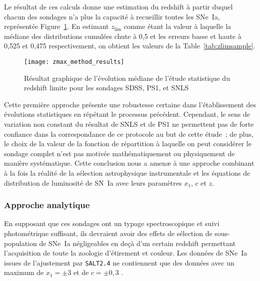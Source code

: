 \documentclass[../main/main.tex]{subfiles}
\begin{document}
Le résultat de ces calculs donne une estimation du redshift à partir duquel
chacun des sondages n'a plus la capacité à recueillir toutes les SNe~Ia,
représentée Figure~\ref{fig:zmax_method_results}. En estimant $z_{\lim}$ comme
étant la valeur à laquelle la médiane des distributions cumulées chute à 0,5 et
les erreurs basse et haute à 0,525 et 0,475 respectivement, on obtient les
valeurs de la Table~\ref{tab:zlimsample}.

\begin{figure}[ht]
    \centering
    \texttt{[image: zmax\_method\_results]}
    \captionsetup{justification=centering}
    \caption[Évolution médiane du redshift limite des sondages SDSS, PS1 et SNLS
    par approche statistique]{Résultat graphique de l'évolution médiane de
    l'étude statistique du redshift limite pour les sondages SDSS, PS1, et SNLS}
    \label{fig:zmax_method_results}
\end{figure}

Cette première approche présente une robustesse certaine dans l'établissement
des évolutions statistiques en répétant le processus précédent. Cependant, le
sens de variation non constant du résultat de SNLS et de PS1 ne permettent pas
de forte confiance dans la correspondance de ce protocole au but de cette
étude~; de plus, le choix de la valeur de la fonction de répartition à laquelle
on peut considérer le sondage complet n'est pas motivée mathématiquement ou
physiquement de manière systématique. Cette conclusion nous a amenæ à une
approche combinant à la fois la réalité de la sélection astrophysique
instrumentale et les équations de distribution de luminosité de SN~Ia avec leurs
paramètres $x_1$, $c$ et $z$.

\subsubsection{Approche analytique}\label{sssec:maglim}

En supposant que ces sondages ont un typage spectroscopique et suivi
photométrique suffisant, ils devraient avoir des effets de sélection de
sous-population de SNe~Ia négligeables en deçà d'un certain redshift permettant
l'acquisition de toute la zoologie d'étirement et couleur. Les données de SNe~Ia
issues de l'ajustement par \texttt{SALT2.4} ne contiennent que des données avec
un maximum de $x_1 = \pm 3$ et de $c = \pm 0,3$ \citep[][cf
Section~\ref{ssec:salt}]{guy2007, betoule2014}.
\end{document}
